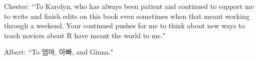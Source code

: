\cleardoublepage\newpage
\thispagestyle{empty}

\begin{center}
Chester: ``To Karolyn, who has always been patient and continued to support me to write and finish edits on this book even sometimes when that meant working through a weekend.  Your continued pushes for me to think about new ways to teach novices about R have meant the world to me."

Albert: ``To 엄마, 아빠, and Ginna."
\end{center}

\setlength{\abovedisplayskip}{-5pt}
\setlength{\abovedisplayshortskip}{-5pt}
